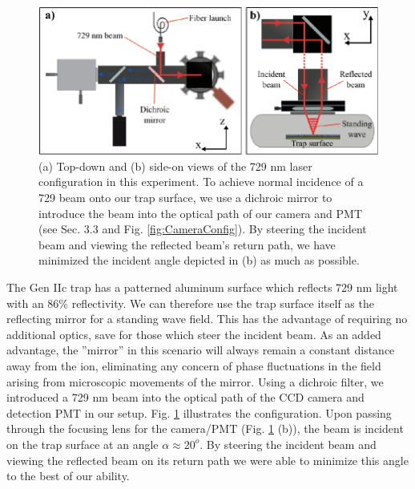 \begin{figure}[t]
    \begin{center}
        \includegraphics{figures/4/Fig_SWlaserConfigR}
        \caption{\label{fig:SWlaserConfig} (a) Top-down and (b) side-on views of the 729 nm laser configuration in this experiment. To achieve normal incidence of a 729 beam onto our trap surface, we use a dichroic mirror to introduce the beam into the optical path of our camera and PMT (see Sec. 3.3 and Fig. \ref{fig:CameraConfig}). By steering the incident beam and viewing the reflected beam's return path, we have minimized the incident angle depicted in (b) as much as possible.    }
    \end{center}
\end{figure}


The Gen IIc trap has a patterned aluminum surface which reflects 729 nm light with an 86\% reflectivity. We can therefore use the trap surface itself as the reflecting mirror for a standing wave field. This has the advantage of requiring no additional optics, save for those which steer the incident beam. As an added advantage, the ''mirror'' in this scenario will always remain a constant distance away from the ion, eliminating any concern of phase fluctuations in the field arising from microscopic movements of the mirror. Using a dichroic filter, we introduced a 729 nm beam into the optical path of the CCD camera and detection PMT in our setup. Fig. \ref{fig:SWlaserConfig} illustrates the configuration. Upon passing through the focusing lens for the camera/PMT (Fig. \ref{fig:SWlaserConfig} (b)), the beam is incident on the trap surface at an angle $\alpha \approx 20^o$. By steering the incident beam and viewing the reflected beam on its return path we were able to minimize this angle to the best of our ability. 

